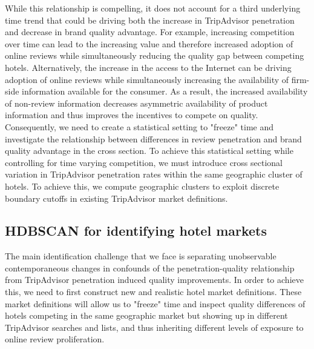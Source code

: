 \documentclass{informs_mod} %
\begin{document}
While this relationship is compelling, it does not account for a third underlying time trend that could be driving both the increase in TripAdvisor penetration and decrease in brand quality advantage. For example, increasing competition over time can lead to the increasing value and therefore increased adoption of online reviews while simultaneously reducing the quality gap between competing hotels. Alternatively, the increase in the access to the Internet can be driving adoption of online reviews while simultaneously increasing the availability of firm-side information available for the consumer. As a result, the increased availability of non-review information decreases asymmetric availability of product information and thus improves the incentives to compete on quality. Consequently, we need to create a statistical setting to "freeze" time and investigate the relationship between differences in review penetration and brand quality advantage in the cross section. To achieve this statistical setting while controlling for time varying competition, we must introduce cross sectional variation in TripAdvisor penetration rates within the same geographic cluster of hotels. To achieve this, we compute geographic clusters to exploit discrete boundary cutoffs in existing TripAdvisor market definitions. 


\subsection{HDBSCAN for identifying hotel markets}\label{sec:hdbscan}
The main identification challenge that we face is separating unobservable contemporaneous changes in confounds of the penetration-quality relationship from TripAdvisor penetration induced quality improvements. In order to achieve this, we need to first construct new and realistic hotel market definitions. These market definitions will allow us to "freeze" time and inspect quality differences of hotels competing in the same geographic market but showing up in different TripAdvisor searches and lists, and thus inheriting different levels of exposure to online review proliferation.
\end{document}
